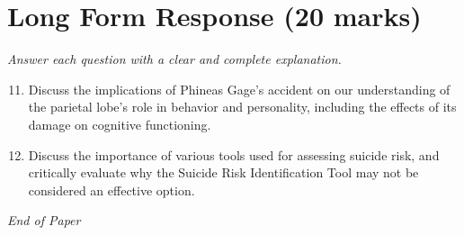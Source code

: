 \documentclass[12pt]{article}
\begin{document}
\section*{Long Form Response (20 marks)}
\textit{Answer each question with a clear and complete explanation.}
\begin{enumerate}[label=\arabic*.]
\setcounter{enumi}{10}
\item Discuss the implications of Phineas Gage's accident on our understanding of the parietal lobe's role in behavior and personality, including the effects of its damage on cognitive functioning.
\item Discuss the importance of various tools used for assessing suicide risk, and critically evaluate why the Suicide Risk Identification Tool may not be considered an effective option.
\end{enumerate}

\vfill
\noindent\textit{End of Paper}
\end{document}
